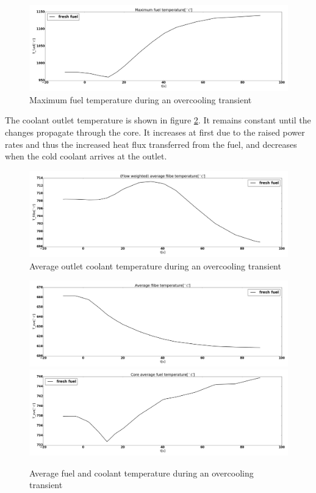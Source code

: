 \documentclass{elsarticle}
\begin{document}
\begin{figure}
    \centering
    \includegraphics[width=\textwidth]{images/diffusion/mk1/OC/T_fuel_max.png}
    \caption{Maximum fuel temperature during an overcooling transient}
    \label{fig:mk1_oc_fuel}
\end{figure}

The coolant outlet temperature is shown in figure \ref{fig:mk1_oc_t_out}. It remains constant until the changes propagate through the core. 
It increases at first due to the raised power rates and thus the increased heat flux transferred from the fuel, and decreases when the cold coolant arrives at the outlet.
\begin{figure}
    \centering
    \includegraphics[width=\textwidth]{images/diffusion/mk1/OC/T_flibe_out.png}
    \caption{Average outlet coolant temperature during an overcooling transient}
    \label{fig:mk1_oc_t_out}
\end{figure}




\begin{figure}
    \centering
    \includegraphics[width=\textwidth]{images/diffusion/mk1/OC/T_flibe_ave.png}
    \includegraphics[width=\textwidth]{images/diffusion/mk1/OC/T_fuel_ave.png}
    \caption{Average fuel and coolant temperature during an overcooling transient}
    \label{fig:mk1_OC}
\end{figure}
\end{document}
